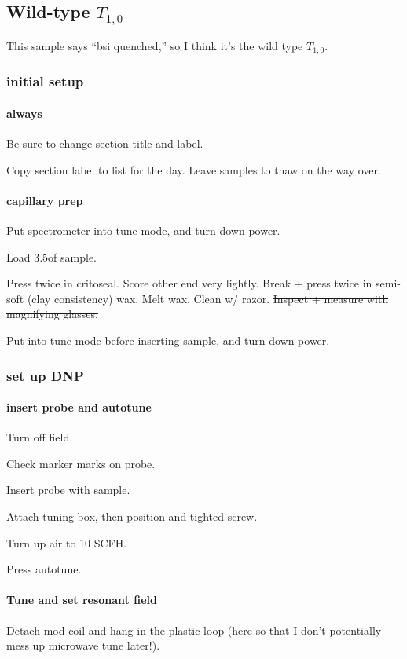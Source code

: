 \subsection{Wild-type $T_{1,0}$}\label{sec:florida_sample2_t10}
\timeblockstart
{}
This sample says ``bsi quenched,'' so I think it's the wild type $T_{1,0}$.
\subsubsection{initial setup}
\paragraph{always}
Be sure to change section title and label.

\sout{ Copy section label to list for the day. }
Leave samples to thaw on the way over.

\paragraph{capillary prep}
Put spectrometer into tune mode, and turn down power.

Load 3.5\uL of sample.

Press twice in critoseal.
Score other end very lightly.
Break + press twice in semi-soft (clay consistency) wax.
Melt wax.
Clean w/ razor.
\sout{ Inspect + measure with magnifying glasses. }

Put into tune mode before inserting sample, and turn down power.

\subsubsection{set up DNP}
\paragraph{insert probe and autotune}

Turn off field.

Check marker marks on probe.

Insert probe with sample.

Attach tuning box, then position and tighted screw.

Turn up air to 10 SCFH.

Press autotune.

\paragraph{Tune and set resonant field}
Detach mod coil and hang in the plastic loop (here so that I don't potentially mess up microwave tune later!).

